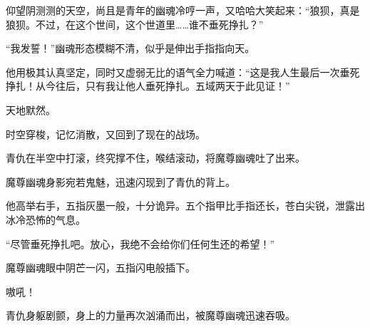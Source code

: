\begin{this_body}
仰望阴测测的天空，尚且是青年的幽魂冷哼一声，又哈哈大笑起来：“狼狈，真是狼狈。不过，在这个世间，这个世道里……谁不垂死挣扎？”

“我发誓！”幽魂形态模糊不清，似乎是伸出手指指向天。

他用极其认真坚定，同时又虚弱无比的语气全力喊道：“这是我人生最后一次垂死挣扎！从今往后，只有我让他人垂死挣扎。五域两天于此见证！”

天地默然。

时空穿梭，记忆消散，又回到了现在的战场。

青仇在半空中打滚，终究撑不住，喉结滚动，将魔尊幽魂吐了出来。

魔尊幽魂身影宛若鬼魅，迅速闪现到了青仇的背上。

他高举右手，五指灰墨一般，十分诡异。五个指甲比手指还长，苍白尖锐，泄露出冰冷恐怖的气息。

“尽管垂死挣扎吧。放心，我绝不会给你们任何生还的希望！”

魔尊幽魂眼中阴芒一闪，五指闪电般插下。

嗷吼！

青仇身躯剧颤，身上的力量再次汹涌而出，被魔尊幽魂迅速吞吸。

\end{this_body}

